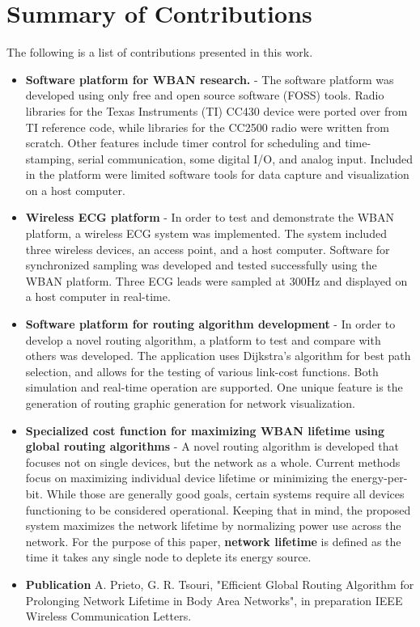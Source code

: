 \documentclass{article}
\begin{document}
\section*{Summary of Contributions}
The following is a list of contributions presented in this work.
\begin{itemize}
\item \textbf{Software platform for WBAN research.} - The software platform was developed using only free and open source software (FOSS) tools. Radio libraries for the Texas Instruments (TI) CC430 device were ported over from TI reference code, while libraries for the CC2500 radio were written from scratch. Other features include timer control for scheduling and time-stamping, serial communication, some digital I/O, and analog input. Included in the platform were limited software tools for data capture and visualization on a host computer.

\item \textbf{Wireless ECG platform} - In order to test and demonstrate the WBAN platform, a wireless ECG system was implemented. The system included three wireless devices, an access point, and a host computer. Software for synchronized sampling was developed and tested successfully using the WBAN platform. Three ECG leads were sampled at 300Hz and displayed on a host computer in real-time.

\item \textbf{Software platform for routing algorithm development} - In order to develop a novel routing algorithm, a platform to test and compare with others was developed. The application uses Dijkstra's algorithm for best path selection, and allows for the testing of various link-cost functions. Both simulation and real-time operation are supported. One unique feature is the generation of routing graphic generation for network visualization.

\item \textbf{Specialized cost function for maximizing WBAN lifetime using global routing algorithms} - A novel routing algorithm is developed that focuses not on single devices, but the network as a whole. Current methods focus on maximizing individual device lifetime or minimizing the energy-per-bit. While those are generally good goals, certain systems require all devices functioning to be considered operational. Keeping that in mind, the proposed system maximizes the network lifetime by normalizing power use across the network. For the purpose of this paper, \textbf{network lifetime} is defined as the time it takes any single node to deplete its energy source. 

\item \textbf{Publication} A. Prieto, G. R. Tsouri, "Efficient Global Routing Algorithm for Prolonging Network Lifetime in Body Area Networks", in preparation IEEE Wireless Communication Letters.

\end{itemize}
\end{document}
